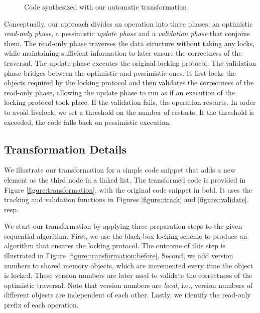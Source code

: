 \begin{figure*}
\begin{center}
\begin{subfigure}[b]{.49\textwidth}
\begin{algorithmic}[1]{}
{			\EndFunction
			}
		\end{algorithmic}
		\caption{ Code synthesized with our
		automatic transformation}\label{figure:transformation:after}
	\end{subfigure}
	\end{center}
	\caption{Code example. 
	The original sequential code
	is in bold.
			\label{figure:transformation}}
\end{figure*}


Conceptually, our approach divides an operation into three phases: an optimistic \emph{read-only phase},
a pessimistic \emph{update phase} and a \emph{validation phase} that conjoins them. 
The read-only phase traverses the data structure without taking any locks, while maintaining sufficient information to later ensure the correctness of the traversal.
The update phase executes the original locking protocol. 
The validation phase bridges between the optimistic and pessimistic ones.
It first locks the objects required by
the locking protocol and then validates the correctness
of the read-only phase, allowing the 
update phase to run as if an execution of the locking
protocol took place. If the validation fails, the operation 
restarts. In order to avoid livelock, we set a threshold on the number of restarts.
If the threshold is exceeded, the code falls back on pessimistic execution. 


\subsection{Transformation Details}\label{ssec:transformation}
We illustrate our transformation for a simple code snippet that adds a new element as the third node in a linked list.
The transformed code is provided in Figure \ref{figure:transformation}, with the original code snippet in bold. It uses
the tracking and validation functions in Figures \ref{figure::track} and 
\ref{figure::validate}, resp.

We start our transformation by applying three preparation steps
to the given sequential algorithm.
First, we use the black-box locking scheme to produce an
algorithm that ensures the locking protocol. The outcome of this step is illustrated in Figure \ref{figure:transformation:before}. 
Second, we add version numbers to shared memory objects, which are 
incremented every time the object is locked. 
These version numbers are later used to validate the correctness of the optimistic traversal.
Note that version numbers are \emph{local}, i.e., version numbers of different objects are independent of each other. 
Lastly, we identify the read-only prefix of each operation.

